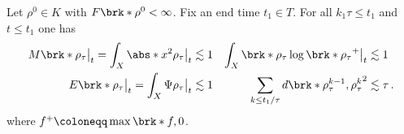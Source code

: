 \begin{frame}
  \begin{proposition}
    Let $\rho^0\in K$ with $F\brk*{\rho^0}<\infty$.
    Fix an end time $t_1\in T$.
    For all $k_1\tau\leq t_1$ and $t\leq t_1$ one has 
    \begin{align*}
      M\brk*{\rho_\tau}\big|_{t}=\int_X\abs*{x}^2\rho_\tau\big|_{t}&\lesssim 1 &  
      \int_X \brk*{\rho_\tau\log\brk*{\rho_\tau}}^+\big|_{t} &\lesssim 1 \\
      E\brk*{\rho_\tau}\big|_{t}=\int_X\Psi\rho_\tau\big|_{t} &\lesssim 1 &
      \sum_{k\leq t_1/\tau}d\brk*{\rho_\tau^{k-1},\rho_\tau^k}^2 &\lesssim \tau\,.
    \end{align*}
    where $f^+\coloneqq\max\brk*{f,0}$.
  \end{proposition}



\end{frame}
